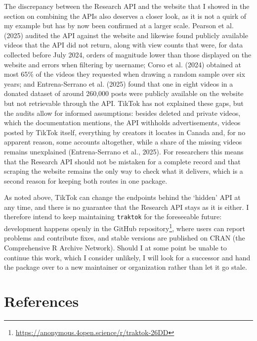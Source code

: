 \documentclass[
  nobib]{ccr}
\begin{document}
The discrepancy between the Research API and the website that I showed
in the section on combining the APIs also deserves a closer look, as it
is not a quirk of my example but has by now been confirmed at a larger
scale. Pearson et al. (2025) audited the API against the website and
likewise found publicly available videos that the API did not return,
along with view counts that were, for data collected before July 2024,
orders of magnitude lower than those displayed on the website and errors
when filtering by username; Corso et al. (2024) obtained at most 65\% of
the videos they requested when drawing a random sample over six years;
and Entrena-Serrano et al. (2025) found that one in eight videos in a
donated dataset of around 260,000 posts were publicly available on the
website but not retrievable through the API. TikTok has not explained
these gaps, but the audits allow for informed assumptions: besides
deleted and private videos, which the documentation mentions, the API
withholds advertisements, videos posted by TikTok itself, everything by
creators it locates in Canada and, for no apparent reason, some accounts
altogether, while a share of the missing videos remains unexplained
(Entrena-Serrano et al., 2025). For researchers this means that the
Research API should not be mistaken for a complete record and that
scraping the website remains the only way to check what it delivers,
which is a second reason for keeping both routes in one package.

As noted above, TikTok can change the endpoints behind the `hidden' API
at any time, and there is no guarantee that the Research API stays as it
is either. I therefore intend to keep maintaining \texttt{traktok} for
the foreseeable future: development happens openly in the GitHub
repository\footnote{\url{https://anonymous.4open.science/r/traktok-26DD}},
where users can report problems and contribute fixes, and stable
versions are published on CRAN (the Comprehensive R Archive Network).
Should I at some point be unable to continue this work, which I consider
unlikely, I will look for a successor and hand the package over to a new
maintainer or organization rather than let it go stale.

\newpage

\section*{References}\label{references}
\end{document}

